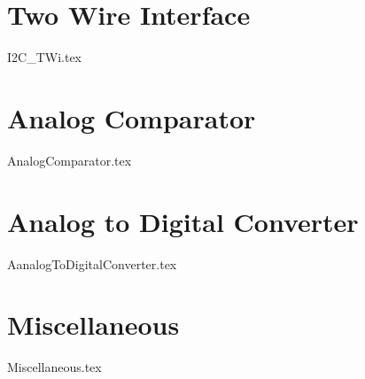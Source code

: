 \documentclass[oneside]{book}
\begin{document}
\chapter{Two Wire Interface}
{I2C_TWi.tex}

\chapter{Analog Comparator}
{AnalogComparator.tex}

\chapter{Analog to Digital Converter}
{AanalogToDigitalConverter.tex}

\chapter{Miscellaneous}
{Miscellaneous.tex}



\end{document}

